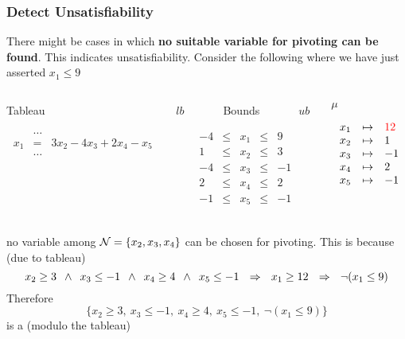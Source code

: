 \begin{frame}
  \frametitle{Detect Unsatisfiability}

  \scriptsize

  There might be cases in which {\bf no suitable variable for pivoting can be found}.
  This indicates unsatisfiability. \pause
  Consider the following where we have just asserted $x_1 \leq 9$
  \vfill
  \begin{columns}

  \begin{column}{.4\textwidth}
  \begin{center}
  Tableau
  \end{center}
  $$
  \begin{array}{rcl}
    & \ldots \\                             
    x_1 & = & 3 x_2 - 4 x_3 + 2 x_4 - x_5 \\ 
    & \ldots \\                             
    \\
    \\
  \end{array}
  $$
  \end{column}

  \begin{column}{.3\textwidth}
  \begin{center}
  $lb$~~~~~~~Bounds~~~~~~~$ub$
  \end{center}
  $$
  \begin{array}{rcccl}
     -4 & \leq & x_1 & \leq & 9 \\
      1 & \leq & x_2 & \leq & 3 \\
     -4 & \leq & x_3 & \leq & -1 \\
      2 & \leq & x_4 & \leq & 2 \\
     -1 & \leq & x_5 & \leq & -1 \\
  \end{array}
  $$
  \end{column}

  \begin{column}{.3\textwidth}
  \begin{center}
  $\mu$
  \end{center}
  $$
  \begin{array}{rcl}
  x_1 & \mapsto & \textcolor{red}{12} \\
  x_2 & \mapsto & 1 \\
  x_3 & \mapsto & -1 \\
  x_4 & \mapsto & 2 \\
  x_5 & \mapsto & -1 
  \end{array}
  $$
  \end{column}

  \end{columns}
  \vfill
  no variable among $\mathcal{N} = \{ x_2, x_3, x_4 \}$ can be chosen for pivoting. This is because (due to tableau)
  $$x_2 \geq 3\ \swedge\ x_3 \leq -1\ \swedge\ x_4 \geq 4\ \swedge\ x_5 \leq -1\ \ \Rightarrow\ \ x_1 \geq 12\ \ \Rightarrow\ \ \neg (x_1 \leq 9)$$
  \vfill
  Therefore
  $$\{ x_2 \geq 3,\ x_3 \leq -1,\ x_4 \geq 4,\ x_5 \leq -1,\ \neg( x_1 \leq 9 ) \}$$
  is a \tconflict (modulo the tableau)

\end{frame}


